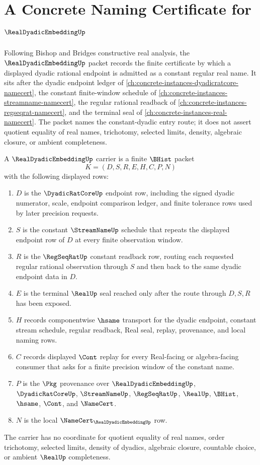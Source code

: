 \chapter{A Concrete Naming Certificate for $\RealDyadicEmbeddingUp$}
\label{ch:concrete-instances-real-dyadic-embedding-namecert}

Following Bishop and Bridges constructive real analysis, the $\RealDyadicEmbeddingUp$ packet records the finite certificate by which a displayed dyadic rational endpoint is admitted as a constant regular real name. It sits after the dyadic endpoint ledger of \autoref{ch:concrete-instances-dyadicratcore-namecert}, the constant finite-window schedule of \autoref{ch:concrete-instances-streamname-namecert}, the regular rational readback of \autoref{ch:concrete-instances-regseqrat-namecert}, and the terminal seal of \autoref{ch:concrete-instances-real-namecert}. The packet names the constant-dyadic entry route; it does not assert quotient equality of real names, trichotomy, selected limits, density, algebraic closure, or ambient completeness.

\begin{definition}
\label{def:real-dyadic-embedding-carrier}
A $\RealDyadicEmbeddingUp$ carrier is a finite $\BHist$ packet
$$
K=(D,S,R,E,H,C,P,N)
$$
with the following displayed rows:
\begin{enumerate}
\item $D$ is the $\DyadicRatCoreUp$ endpoint row, including the signed dyadic numerator, scale, endpoint comparison ledger, and finite tolerance rows used by later precision requests.
\item $S$ is the constant $\StreamNameUp$ schedule that repeats the displayed endpoint row of $D$ at every finite observation window.
\item $R$ is the $\RegSeqRatUp$ constant readback row, routing each requested regular rational observation through $S$ and then back to the same dyadic endpoint data in $D$.
\item $E$ is the terminal $\RealUp$ seal reached only after the route through $D,S,R$ has been exposed.
\item $H$ records componentwise $\hsame$ transport for the dyadic endpoint, constant stream schedule, regular readback, Real seal, replay, provenance, and local naming rows.
\item $C$ records displayed $\Cont$ replay for every Real-facing or algebra-facing consumer that asks for a finite precision window of the constant name.
\item $P$ is the $\Pkg$ provenance over $\RealDyadicEmbeddingUp$, $\DyadicRatCoreUp$, $\StreamNameUp$, $\RegSeqRatUp$, $\RealUp$, $\BHist$, $\hsame$, $\Cont$, and $\NameCert$.
\item $N$ is the local $\NameCert_{\RealDyadicEmbeddingUp}$ row.
\end{enumerate}
The carrier has no coordinate for quotient equality of real names, order trichotomy, selected limits, density of dyadics, algebraic closure, countable choice, or ambient $\RealUp$ completeness.
\end{definition}

